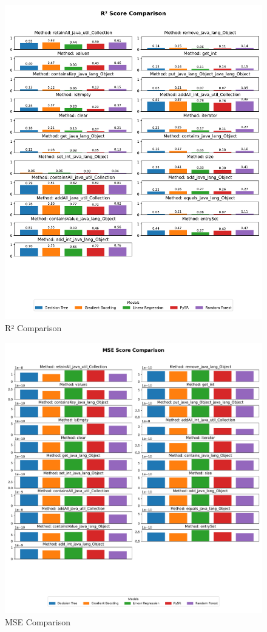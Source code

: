 \begin{figure}[htbp]
  \centering
  \includegraphics[width = .8 \textwidth]{figures/r2_comparison.pdf}
  \caption{R² Comparison}
  \label{fig:r2_comparison}
\end{figure}

\begin{figure}[htbp]
  \centering
  \includegraphics[width = .8 \textwidth]{figures/mse_comparison.pdf}
  \caption{MSE Comparison}
  \label{fig:mse_comparison}
\end{figure}

